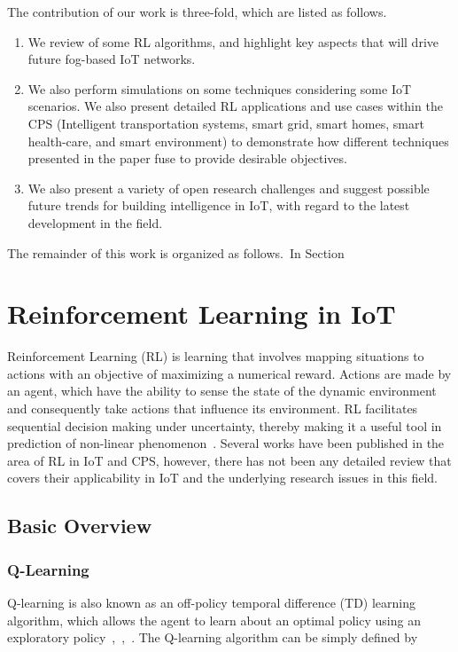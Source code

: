 \documentclass[journal]{IEEEtran}
\begin{document}
The contribution of our work is three-fold, which are listed as follows.
\indent
    \begin{enumerate}[leftmargin=*,label= \arabic*)]
      \item We review of some RL algorithms, and highlight key aspects that will drive future fog-based IoT networks.

      \item We also perform simulations on some techniques considering some IoT scenarios. We also present detailed RL applications and use cases within the CPS (Intelligent transportation systems, smart grid, smart homes, smart health-care, and smart environment) to demonstrate how different techniques presented in the paper fuse to provide desirable objectives.

      \item  We also present a variety of open research challenges and suggest possible future trends for building intelligence in IoT,
      with regard to the latest development in the field.
    \end{enumerate}


The remainder of this work is organized as follows.~In Section

\section{Reinforcement Learning in IoT}\label{sec:RLIoT}
Reinforcement Learning (RL) is learning that involves mapping situations to actions with an objective of maximizing a numerical reward. Actions are made by an agent, which have the ability to sense the state of the dynamic environment and consequently take actions that influence its environment. RL facilitates sequential decision making under uncertainty, thereby making it a useful tool in prediction of non-linear phenomenon~\cite{Zhang18}. Several works have been published in the area of RL in IoT and CPS, however, there has not been any detailed review that covers their applicability in IoT and the underlying research issues in this field.

\subsection{Basic Overview}

\subsubsection{Q-Learning}
Q-learning is also known as an off-policy temporal difference (TD) learning algorithm, which allows the agent to learn about an optimal policy using an exploratory policy~\cite{Watkins92},~\cite{Wen15},~\cite{Sutton98}. The Q-learning algorithm can be simply defined by
\end{document}
